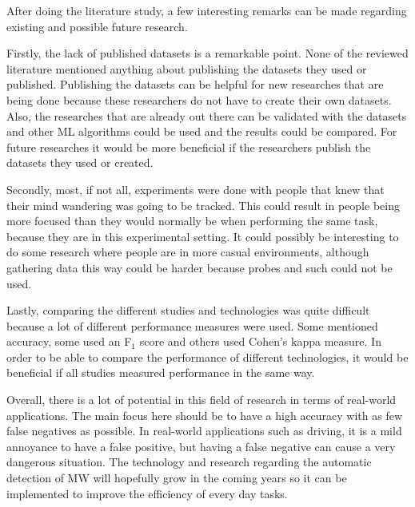 After doing the literature study, a few interesting remarks can be made regarding existing and possible future research. 

Firstly, the lack of published datasets is a remarkable point. None of the reviewed literature mentioned anything about publishing the datasets they used or published. Publishing the datasets can be helpful for new researches that are being done because these researchers do not have to create their own datasets. Also, the researches that are already out there can be validated with the datasets and other ML algorithms could be used and the results could be compared. For future researches it would be more beneficial if the researchers publish the datasets they used or created. 

Secondly, most, if not all, experiments were done with people that knew that their mind wandering was going to be tracked. This could result in people being more focused than they would normally be when performing the same task, because they are in this experimental setting. It could possibly be interesting to do some research where people are in more casual environments, although gathering data this way could be harder because probes and such could not be used.

Lastly, comparing the different studies and technologies was quite difficult because a lot of different performance measures were used. Some mentioned accuracy, some used an F$_1$ score and others used Cohen's kappa measure. In order to be able to compare the performance of different technologies, it would be beneficial if all studies measured performance in the same way. 

Overall, there is a lot of potential in this field of research in terms of real-world applications. The main focus here should be to have a high accuracy with as few false negatives as possible. In real-world applications such as driving, it is a mild annoyance to have a false positive, but having a false negative can cause a very dangerous situation. The technology and research regarding the automatic detection of MW will hopefully grow in the coming years so it can be implemented to improve the efficiency of every day tasks.